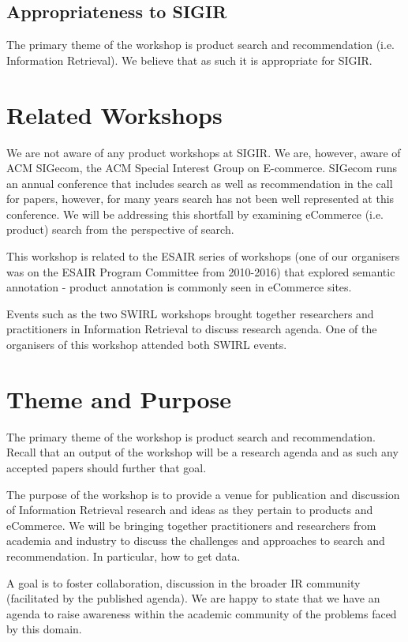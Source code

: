 \documentclass{acmart}
\begin{document}
\subsection{Appropriateness to SIGIR}

The primary theme of the workshop is product search and recommendation
(i.e. Information Retrieval).  We believe that as such it is appropriate
for SIGIR. 

\section{Related Workshops}

We are not aware of any product workshops at SIGIR.  We are, however,
aware of ACM SIGecom, the ACM Special Interest Group on E-commerce.
SIGecom runs an annual conference that includes search as well as
recommendation in the  call for papers, however, for many years search
has not been well represented at this conference.  We will be addressing
this shortfall by examining eCommerce (i.e. product) search from the perspective of search.

This workshop is related to the ESAIR series of workshops (one of our
organisers was on the ESAIR Program Committee from 2010-2016) that
explored semantic annotation - product annotation is commonly seen in eCommerce sites.

Events such as the two SWIRL workshops brought together researchers and
practitioners in Information Retrieval to discuss research agenda.
One of the organisers of this workshop attended both SWIRL events.

\section{Theme and Purpose}

The primary theme of the workshop is product search and
recommendation.  Recall that an output of the workshop will be a
research agenda and as such any accepted papers should further that goal.

The purpose of the workshop is to provide a venue for publication and
discussion of Information Retrieval research and ideas as they pertain
to products and eCommerce.  We will be bringing together practitioners and
researchers from academia and industry to discuss the challenges and
approaches to search and recommendation.  In particular, how
to get data.

A goal is to foster collaboration, discussion in the broader IR
community (facilitated by the published agenda).  We are happy to state
that we have an agenda to raise awareness within the academic community
of the problems faced by this domain.
\end{document}
